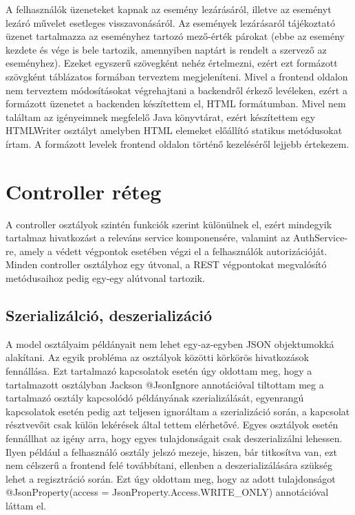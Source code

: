 \documentclass[a4paper,12pt]{report}
\theoremstyle{definition}
\theoremstyle{remark}
\begin{document}
A felhasználók üzeneteket kapnak az esemény lezárásáról, illetve az eseményt lezáró művelet esetleges visszavonásáról. Az események lezárásaról tájékoztató üzenet tartalmazza az eseményhez tartozó mező-érték párokat (ebbe az esemény kezdete és vége is bele tartozik, amennyiben naptárt is rendelt a szervező az eseményhez). Ezeket egyszerű szövegként nehéz értelmezni, ezért ezt formázott szövgként táblázatos formában terveztem megjeleníteni. Mivel a frontend oldalon nem terveztem módosításokat végrehajtani a backendről érkező levéleken, ezért a formázott üzenetet a backenden készítettem el, HTML formátumban. Mivel nem találtam az igényeimnek megfelelő Java könyvtárat, ezért készítettem egy HTMLWriter osztályt amelyben HTML elemeket előállító statikus metódusokat írtam. A formázott levelek frontend oldalon történő kezeléséről lejjebb értekezem.

\section{Controller réteg}

A controller osztályok szintén funkciók szerint különülnek el, ezért mindegyik tartalmaz hivatkozást a releváns service komponensére, valamint az AuthService-re, amely a védett végpontok esetében végzi el a felhasználók autorizációját. Minden controller osztályhoz egy útvonal, a REST végpontokat megvalósító metódusaihoz pedig egy-egy alútvonal tartozik.

\subsection{Szerializálció, deszerializáció}

A model osztályaim példányait nem lehet egy-az-egyben JSON objektumokká alakítani. Az egyik probléma az osztályok közötti körkörös hivatkozások fennállása. Ezt tartalmazó kapcsolatok esetén úgy oldottam meg, hogy a tartalmazott osztályban Jackson @JsonIgnore annotációval tiltottam meg a tartalmazó osztály kapcsolódó példányának szerializálását, egyenrangú kapcsolatok esetén pedig azt teljesen ignoráltam a szerializáció során, a kapcsolat résztvevőit csak külön lekérések által tettem elérhetővé. Egyes osztályok esetén fennállhat az igény arra, hogy egyes tulajdonságait csak deszerializálni lehessen. Ilyen például a felhasználó osztály jelszó mezeje, hiszen, bár titkosítva van, ezt nem célszerű a frontend felé továbbítani, ellenben a deszerializálására szükség lehet a regisztráció során. Ezt úgy oldottam meg, hogy az adott tulajdonságot @JsonProperty(access = JsonProperty.Access.WRITE\_ONLY) annotációval láttam el.
\end{document}
